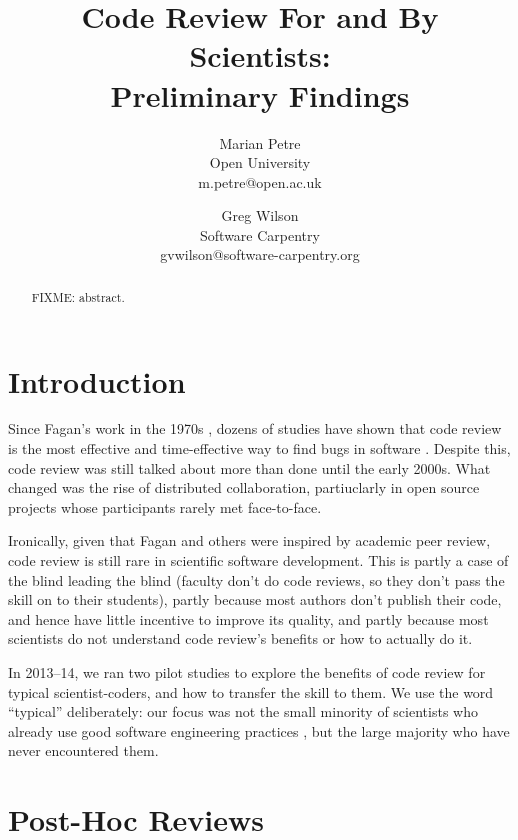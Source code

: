 \documentclass[10pt,twocolumn]{article}
\begin{document}
\title{Code Review For and By Scientists:\\Preliminary Findings}
\author{
  Marian Petre \\ {\small Open University} \\ {\small m.petre@open.ac.uk}
  \and
  Greg Wilson \\ {\small Software Carpentry} \\ {\small gvwilson@software-carpentry.org}
}

\maketitle

\begin{abstract}

FIXME: abstract.

\end{abstract}

\section{Introduction}

Since Fagan's work in the 1970s \cite{b:fagan1976,b:fagan1986},
dozens of studies have shown that code review is the most effective and time-effective way to find bugs in software \cite{b:cohen2010}.
Despite this,
code review was still talked about more than done until the early 2000s.
What changed was the rise of distributed collaboration,
partiuclarly in open source projects whose participants rarely met face-to-face.

Ironically,
given that Fagan and others were inspired by academic peer review,
code review is still rare in scientific software development.
This is partly a case of the blind leading the blind
(faculty don't do code reviews, so they don't pass the skill on to their students),
partly because most authors don't publish their code,
and hence have little incentive to improve its quality,
and partly because most scientists do not understand code review's benefits or how to actually do it.

In 2013--14,
we ran two pilot studies to explore
the benefits of code review for typical scientist-coders,
and how to transfer the skill to them.
We use the word ``typical'' deliberately:
our focus was not the small minority of scientists who already use good software engineering practices \cite{b:hannay2009},
but the large majority who have never encountered them.

\section{Post-Hoc Reviews}
\end{document}
